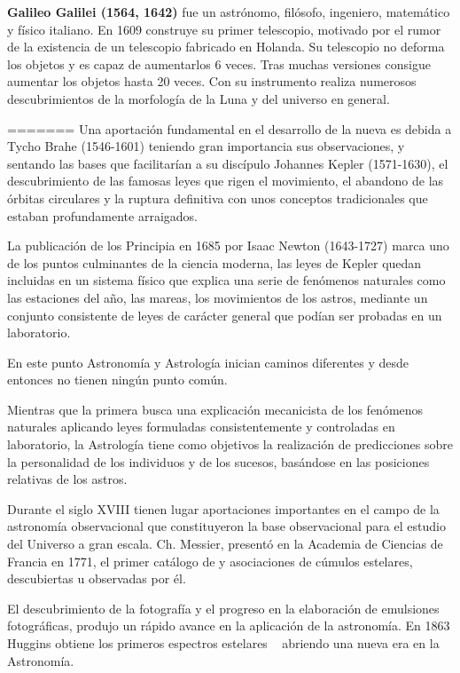 \textbf{Galileo Galilei (1564, 1642)} \cite{galileo} fue un astrónomo, filósofo, ingeniero, matemático y físico italiano. En 1609 construye su primer telescopio, motivado por el rumor de la existencia de un telescopio fabricado en Holanda. Su telescopio no deforma los objetos y es capaz de aumentarlos 6 veces. Tras muchas versiones consigue aumentar los objetos hasta 20 veces. Con su instrumento realiza numerosos descubrimientos de la morfología de la Luna y del universo en general.  
 


=======
\bigskip
Una aportación fundamental en el desarrollo de la nueva es debida a Tycho Brahe (1546-1601)\cite{Tycho} teniendo gran importancia sus observaciones, y  sentando las bases que facilitarían a su discípulo Johannes Kepler (1571-1630)\cite{Kepler}, el descubrimiento de las famosas leyes que rigen el movimiento, el abandono de las órbitas circulares y la ruptura definitiva con unos conceptos tradicionales que estaban profundamente arraigados. 

\bigskip
La publicación de los Principia en 1685 por Isaac Newton (1643-1727)\cite{Newton} marca uno de los puntos culminantes de la ciencia moderna, las leyes de Kepler quedan incluidas en un sistema físico que explica una serie de fenómenos naturales como las estaciones del año, las mareas, los movimientos de los astros, mediante un conjunto consistente de leyes de carácter general que podían ser probadas en un laboratorio.

\bigskip
En este punto Astronomía y Astrología inician caminos diferentes y desde entonces no tienen ningún punto común.

\bigskip
Mientras que la primera busca una explicación mecanicista de los fenómenos naturales aplicando leyes formuladas consistentemente y controladas en laboratorio, la Astrología tiene como objetivos la realización de predicciones sobre la personalidad de los individuos y de los sucesos, basándose en las posiciones relativas de los astros.\cite{astrologia}

\bigskip
Durante el siglo XVIII tienen lugar aportaciones importantes en el campo de la astronomía observacional que constituyeron la base observacional para el estudio del Universo a gran escala. Ch. Messier, presentó en la Academia de Ciencias de Francia en 1771, el primer catálogo de y asociaciones de cúmulos estelares, descubiertas u observadas por él\cite{messier}.

\bigskip
El descubrimiento de la fotografía y el progreso en la elaboración de emulsiones fotográficas, produjo un rápido avance en la aplicación de la astronomía. En 1863 Huggins obtiene los primeros espectros estelares ~\cite{analisispectal} abriendo una nueva era en la Astronomía\cite{huggins}.

